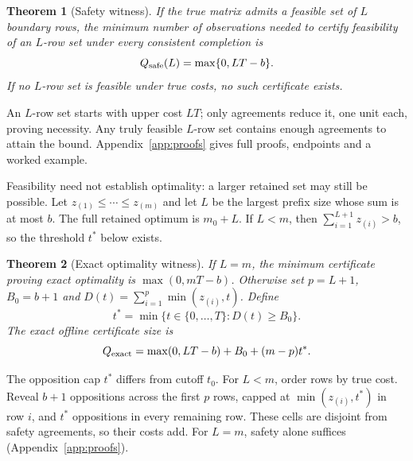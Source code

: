 \documentclass[11pt]{article}
\newtheorem{theorem}{Theorem}
\begin{document}
\begin{theorem}[Safety witness]
\label{thm:safe}
If the true matrix admits a feasible set of $L$ boundary rows, the minimum number of observations needed to certify feasibility of an $L$-row set under every consistent completion is
\[
 Q_{\rm safe}(L)=\max\{0,LT-b\}.
\]
If no $L$-row set is feasible under true costs, no such certificate exists.
\end{theorem}
An $L$-row set starts with upper cost $LT$; only agreements reduce it, one unit each, proving necessity. Any truly feasible $L$-row set contains enough agreements to attain the bound. Appendix~\ref{app:proofs} gives full proofs, endpoints and a worked example.

Feasibility need not establish optimality: a larger retained set may still be possible. Let $z_{(1)}\le\cdots\le z_{(m)}$ and let $L$ be the largest prefix size whose sum is at most $b$. The full retained optimum is $m_0+L$. If $L<m$, then $\sum_{i=1}^{L+1}z_{(i)}>b$, so the threshold $t^*$ below exists.
\begin{theorem}[Exact optimality witness]
\label{thm:exact}
If $L=m$, the minimum certificate proving exact optimality is $\max(0,mT-b)$. Otherwise set $p=L+1$, $B_0=b+1$ and $D(t)=\sum_{i=1}^{p}\min(z_{(i)},t)$. Define
\begin{equation}
 t^*=\min\{t\in\{0,\ldots,T\}:D(t)\ge B_0\}.
 \label{eq:level}
\end{equation}
The exact offline certificate size is
\begin{equation}
 Q_{\rm exact}=\max(0,LT-b)+B_0+(m-p)t^*.
 \label{eq:exact}
\end{equation}
\end{theorem}
The opposition cap $t^*$ differs from cutoff $t_0$. For $L<m$, order rows by true cost. Reveal $b+1$ oppositions across the first $p$ rows, capped at $\min(z_{(i)},t^*)$ in row $i$, and $t^*$ oppositions in every remaining row. These cells are disjoint from safety agreements, so their costs add. For $L=m$, safety alone suffices (Appendix~\ref{app:proofs}).
\end{document}
